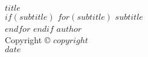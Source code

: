 \begin{titlepage}
    \centering
    \vspace*{7cm}
    {\Huge \textbf{$title$}}\\[1cm]
    $if(subtitle)$
        $for(subtitle)$
            {\large \textit{$subtitle$}}\\
        $endfor$
    $endif$
    \vfill
    {\Large $author$}\\[0.5cm]
    {\small Copyright \copyright{} $copyright$}\\[0.5cm]
    {\large $date$}
\end{titlepage}
